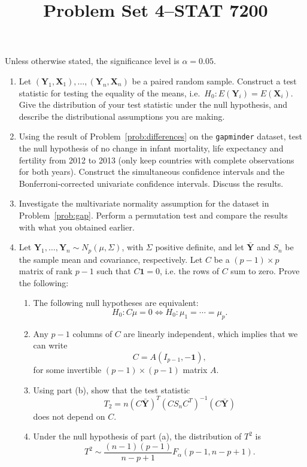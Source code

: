 \documentclass[12pt]{paper}
\title{	
Problem Set 4--STAT 7200
}
\author{} %
\date{} %
\numberwithin{equation}{section} %
\numberwithin{figure}{section} %
\numberwithin{table}{section} %
\begin{document}
\maketitle %


Unless otherwise stated, the significance level is $\alpha = 0.05$.

\begin{enumerate}
	\item\label{prob:differences} Let $(\mathbf{Y}_1, \mathbf{X}_1), \ldots, (\mathbf{Y}_n, \mathbf{X}_n)$ be a paired random sample. Construct a test statistic for testing the equality of the means, i.e.\ $H_0: E(\mathbf{Y}_i) = E(\mathbf{X}_i)$. Give the distribution of your test statistic under the null hypothesis, and describe the distributional assumptions you are making.
	
	\vspace{1.5cm}\item\label{prob:gap} Using the result of Problem~\ref{prob:differences} on the \texttt{gapminder} dataset, test the null hypothesis of no change in infant mortality, life expectancy and fertility from 2012 to 2013 (only keep countries with complete observations for both years). Construct the simultaneous confidence intervals and the Bonferroni-corrected univariate confidence intervals. Discuss the results. 
	
	\vspace{1.5cm}\item Investigate the multivariate normality assumption for the dataset in Problem~\ref{prob:gap}. Perform a permutation test and compare the results with what you obtained earlier.
	
	\vspace{1.5cm}\item\label{prob:contrasts} Let $\mathbf{Y}_1, \ldots, \mathbf{Y}_n \sim N_p(\mu, \Sigma)$, with $\Sigma$ positive definite, and let $\bar{\mathbf{Y}}$ and $S_n$ be the sample mean and covariance, respectively. Let $C$ be a $(p-1)\times p$ matrix of rank $p-1$ such that $C\mathbf{1} = 0$, i.e. the rows of $C$ sum to zero. Prove the following:
	\begin{enumerate}
		\item The following null hypotheses are equivalent:
		$$H_0: C\mu = 0 \Leftrightarrow H_0: \mu_1 = \cdots = \mu_p.$$
		\item Any $p-1$ columns of $C$ are linearly independent, which implies that we can write
		$$ C = A (I_{p-1}, -\mathbf{1}),$$
		for some invertible $(p-1)\times(p-1)$ matrix $A$.
		\item Using part (b), show that the test statistic
		$$ T_2 = n(C\bar{\mathbf{Y}})^T(CS_n C^T)^{-1}(C\bar{\mathbf{Y}})$$
		does not depend on $C$.
		\item Under the null hypothesis of part (a), the distribution of $T^2$ is
		$$ T^2 \sim \frac{(n - 1)(p - 1)}{n - p + 1}F_\alpha(p-1, n - p +1).$$
	\end{enumerate}


\end{enumerate}
\end{document}
